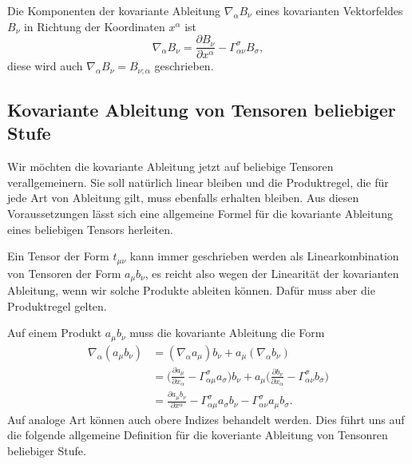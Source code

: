 \begin{definition}
Die Komponenten der kovariante Ableitung $\nabla_\alpha B_\nu$ eines
kovarianten Vektorfeldes $B_\nu$ in Richtung der Koordinaten $x^\alpha$
ist
\begin{equation}
\nabla_\alpha B_\nu
=
\frac{\partial B_\nu}{\partial x^\alpha}
-\Gamma^{\sigma}_{\alpha\nu}B_\sigma,
\label{skript:geodaeten:kovabl2}
\end{equation}
diese wird auch $\nabla_\alpha B_\nu=B_{\nu;\alpha}$ geschrieben.
\end{definition}

\subsection{Kovariante Ableitung von Tensoren beliebiger Stufe}
Wir möchten die kovariante Ableitung jetzt auf beliebige Tensoren
verallgemeinern.
Sie soll natürlich linear bleiben und die Produktregel, die für jede
Art von Ableitung gilt, muss ebenfalls erhalten bleiben.
Aus diesen Voraussetzungen lässt sich eine allgemeine Formel für
die kovariante Ableitung eines beliebigen Tensors herleiten.

Ein Tensor der Form $t_{\mu\nu}$ kann immer geschrieben werden
als Linearkombination von Tensoren der Form $a_\mu b_\nu$, es reicht
also wegen der Linearität der kovarianten Ableitung, wenn wir solche
Produkte ableiten können.
Dafür muss aber die Produktregel gelten.

Auf einem Produkt $a_\mu b_\nu$ muss die kovariante Ableitung die Form
\begin{align*}
\nabla_\alpha (a_\mu b_\nu)
&=
(\nabla_\alpha a_\mu) b_\nu
+
a_\mu(\nabla_\alpha b_\nu)
\\
&=
\biggl(
\frac{\partial a_\mu}{\partial x_\alpha}
-
\Gamma^\sigma_{\alpha\mu}a_\sigma
\biggr)b_\nu
+
a_\mu
\biggl(
\frac{\partial b_\nu}{\partial x_\alpha}
-
\Gamma^\sigma_{\alpha\nu}b_\sigma
\biggr)
\\
&=
\frac{\partial a_\mu b_\nu}{\partial x^\alpha}
-\Gamma^\sigma_{\alpha\mu}a_\sigma b_\nu
-\Gamma^\sigma_{\alpha\nu}a_\mu b_\sigma.
\end{align*}
Auf analoge Art können auch obere Indizes behandelt werden.
Dies führt uns auf die folgende allgemeine Definition für die 
koveriante Ableitung von Tensonren beliebiger Stufe.

